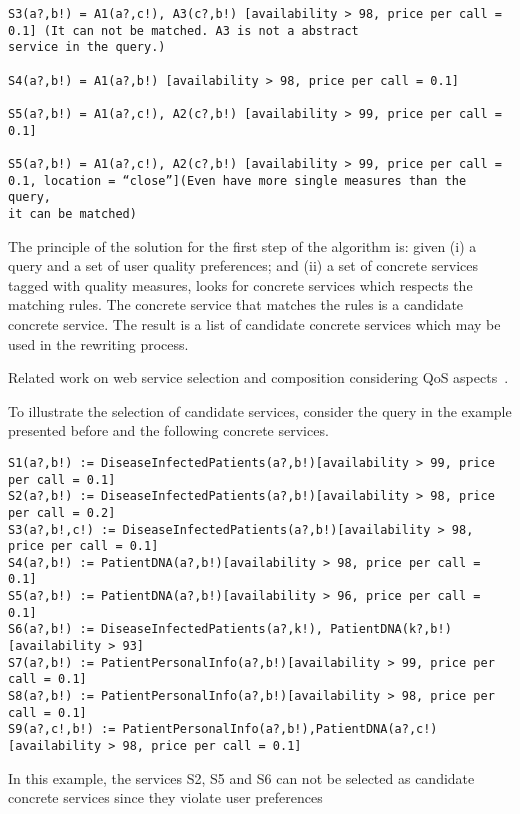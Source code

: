 \documentclass{sig-alternate}
\begin{document}
\begin{itemize}
\begin{tiny}
\begin{verbatim}
S3(a?,b!) = A1(a?,c!), A3(c?,b!) [availability > 98, price per call = 0.1] (It can not be matched. A3 is not a abstract
service in the query.)

S4(a?,b!) = A1(a?,b!) [availability > 98, price per call = 0.1]

S5(a?,b!) = A1(a?,c!), A2(c?,b!) [availability > 99, price per call = 0.1]

S5(a?,b!) = A1(a?,c!), A2(c?,b!) [availability > 99, price per call = 0.1, location = “close”](Even have more single measures than the query, 
it can be matched)
\end{verbatim}
\end{tiny}
\end{itemize}

The principle of the solution for the first step of the algorithm is: given (i) a query and a set of user quality preferences; and (ii) a set of concrete services tagged with quality measures, looks for concrete services which respects the matching rules. The concrete service that matches the rules is a candidate concrete service. The result is a list of candidate concrete services which may be used in the rewriting process.

Related work on web service selection and composition considering QoS aspects~\cite{}. 

To illustrate the selection of candidate services, consider the query in the example presented before and the following concrete services.
\begin{tiny}
\begin{verbatim}
S1(a?,b!) := DiseaseInfectedPatients(a?,b!)[availability > 99, price per call = 0.1]
S2(a?,b!) := DiseaseInfectedPatients(a?,b!)[availability > 98, price per call = 0.2]
S3(a?,b!,c!) := DiseaseInfectedPatients(a?,b!)[availability > 98, price per call = 0.1]
S4(a?,b!) := PatientDNA(a?,b!)[availability > 98, price per call = 0.1]
S5(a?,b!) := PatientDNA(a?,b!)[availability > 96, price per call = 0.1]
S6(a?,b!) := DiseaseInfectedPatients(a?,k!), PatientDNA(k?,b!)[availability > 93]
S7(a?,b!) := PatientPersonalInfo(a?,b!)[availability > 99, price per call = 0.1]
S8(a?,b!) := PatientPersonalInfo(a?,b!)[availability > 98, price per call = 0.1]
S9(a?,c!,b!) := PatientPersonalInfo(a?,b!),PatientDNA(a?,c!)[availability > 98, price per call = 0.1] 
\end{verbatim}
\end{tiny}

In this example, the services S2, S5 and S6 can not be selected as candidate concrete services since they violate user preferences
\end{document}
